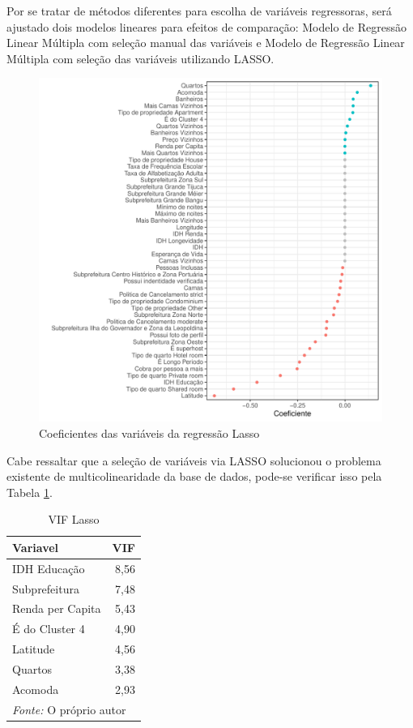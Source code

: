 \documentclass[
	12pt,				%
	a4paper,		%
	oneside,    %
	chapter=TITLE,		   %
	section=TITLE,		   %
	subsection=TITLE,	   %
	subsubsection=TITLE, %
	english,			%
	french,				%
	spanish,			%
	brazil,				%
]{abntex2}
\begin{document}
Por se tratar de métodos diferentes para escolha de variáveis
regressoras, será ajustado dois modelos lineares para efeitos de
comparação: Modelo de Regressão Linear Múltipla com seleção manual das
variáveis e Modelo de Regressão Linear Múltipla com seleção das
variáveis utilizando LASSO.

\begin{figure}
\centering
\includegraphics{00-TCC_files/figure-latex/significancia_lasso-1.pdf}
\caption{\label{significancia_lasso}Coeficientes das variáveis da
regressão Lasso}
\end{figure}

Cabe ressaltar que a seleção de variáveis via LASSO solucionou o
problema existente de multicolinearidade da base de dados, pode-se
verificar isso pela Tabela \ref{tab:vif_lasso}.

\begin{table}

\caption{\label{tab:vif_lasso}VIF Lasso}
\centering
\begin{tabular}[t]{l|r}
\hline
Variavel & VIF\\
\hline
IDH Educação & 8,56\\
\hline
Subprefeitura & 7,48\\
\hline
Renda per Capita & 5,43\\
\hline
É do Cluster 4 & 4,90\\
\hline
Latitude & 4,56\\
\hline
Quartos & 3,38\\
\hline
Acomoda & 2,93\\
\hline
\multicolumn{2}{l}{\textit{Fonte: } O próprio autor}\\
\end{tabular}
\end{table}
\end{document}
